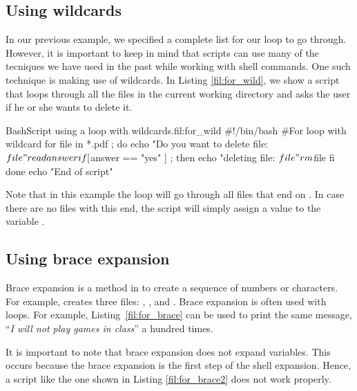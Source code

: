 \subsection{Using wildcards}
In our previous example, we specified a complete list for our  loop to go through. However, it is important to keep in mind that  scripts can use many of the tecniques we have used in the past while working with shell commands. One such technique is making use of wildcards. In Listing \ref{fil:for_wild}, we show a script that loops through all the  files in the current working directory and asks the user if he or she wants to delete it.
\begin{source_code_float}{Bash}{Script using a  loop with wildcards.}{fil:for_wild}
#!/bin/bash
#For loop with wildcard 
for file in *.pdf ; do
   echo "Do you want to delete file: $file"
   read answer
   if [ $answer == "yes" ] ; then
       echo "deleting file: $file"
       rm $file
   fi
done
echo "End of script"
\end{source_code_float}
Note that in this example the loop will go through all files that end on . In case there are no files with this end, the script will simply assign a value  to the variable .
\subsection{Using brace expansion}
Brace expansion is a method in  to create a sequence of numbers or characters. For example,  creates three files: , , and . 
Brace expansion is often used with  loops. For example, Listing~\ref{fil:for_brace} can be used to print the same message, ``\textit{I will not play games in class}'' a hundred times.

It is important to note that brace expansion does not expand  variables. This occurs because the brace expansion is the first step of the shell expansion. Hence, a script like the one shown in Listing \ref{fil:for_brace2} does not work properly.

